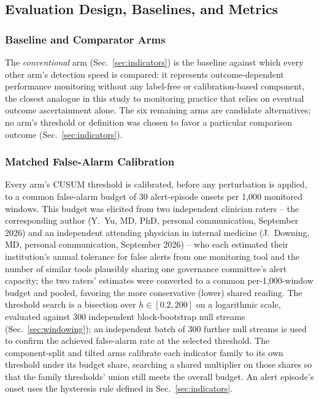 \documentclass[apajournal,article,submit,oneauthor]{Definitions/mdpi}
\begin{document}
\subsection{Evaluation Design, Baselines, and Metrics}\label{sec:calibration}

\subsubsection{Baseline and Comparator Arms}

The \emph{conventional} arm (Sec.~\ref{sec:indicators}) is the baseline against which every other arm's detection speed is compared: it represents outcome-dependent performance monitoring without any label-free or calibration-based component, the closest analogue in this study to monitoring practice that relies on eventual outcome ascertainment alone. The six remaining arms are candidate alternatives; no arm's threshold or definition was chosen to favor a particular comparison outcome (Sec.~\ref{sec:indicators}).

\subsubsection{Matched False-Alarm Calibration}

Every arm's CUSUM threshold is calibrated, before any perturbation is applied, to a common false-alarm budget of 30 alert-episode onsets per 1{,}000 monitored windows. This budget was elicited from two independent clinician raters -- the corresponding author (Y.~Yu, MD, PhD, personal communication, September 2026) and an independent attending physician in internal medicine (J.~Downing, MD, personal communication, September 2026) -- who each estimated their institution's annual tolerance for false alerts from one monitoring tool and the number of similar tools plausibly sharing one governance committee's alert capacity; the two raters' estimates were converted to a common per-1{,}000-window budget and pooled, favoring the more conservative (lower) shared reading. The threshold search is a bisection over $h \in [0.2, 200]$ on a logarithmic scale, evaluated against 300 independent block-bootstrap null streams (Sec.~\ref{sec:windowing}); an independent batch of 300 further null streams is used to confirm the achieved false-alarm rate at the selected threshold. The component-split and tilted arms calibrate each indicator family to its own threshold under its budget share, searching a shared multiplier on those shares so that the family thresholds' union still meets the overall budget. An alert episode's onset uses the hysteresis rule defined in Sec.~\ref{sec:indicators}.
\end{document}
